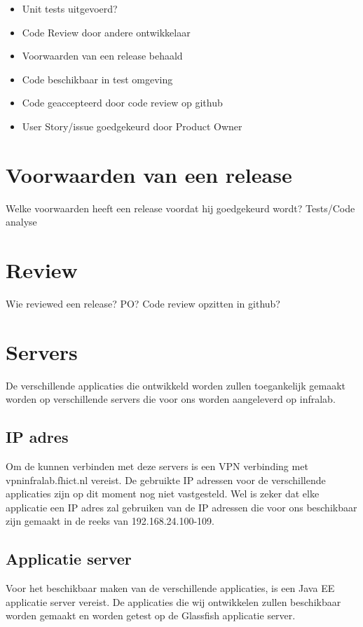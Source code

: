 	\begin{itemize}
			\item Unit tests uitgevoerd?
			\item Code Review door andere ontwikkelaar
			\item Voorwaarden van een release behaald
			\item Code beschikbaar in test omgeving
			\item Code geaccepteerd door code review op github
			\item User Story/issue goedgekeurd door Product Owner		
	\end{itemize}

\section{Voorwaarden van een release}
Welke voorwaarden heeft een release voordat hij goedgekeurd wordt? Tests/Code analyse

\section{Review}
Wie reviewed een release? PO? Code review opzitten in github?

\section{Servers}
De verschillende applicaties die ontwikkeld worden zullen toegankelijk gemaakt worden op verschillende servers die voor ons worden aangeleverd op infralab.

\subsection{IP adres}

Om de kunnen verbinden met deze servers is een VPN verbinding met vpninfralab.fhict.nl vereist. De gebruikte IP adressen voor de verschillende applicaties zijn op dit moment nog niet vastgesteld. Wel is zeker dat elke applicatie een IP adres zal gebruiken van de IP adressen die voor ons beschikbaar zijn gemaakt in de reeks van 192.168.24.100-109.

\subsection{Applicatie server}
Voor het beschikbaar maken van de verschillende applicaties, is een Java EE applicatie server vereist. De applicaties die wij ontwikkelen zullen beschikbaar worden gemaakt en worden getest op de Glassfish applicatie server.